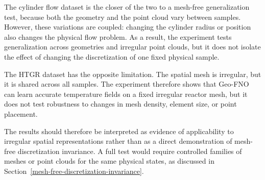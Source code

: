 The cylinder flow dataset is the closer of the two to a mesh-free generalization test, because both the geometry and the point cloud vary between samples. However, these variations are coupled: changing the cylinder radius or position also changes the physical flow problem. As a result, the experiment tests generalization across geometries and irregular point clouds, but it does not isolate the effect of changing the discretization of one fixed physical sample.

The HTGR dataset has the opposite limitation. The spatial mesh is irregular, but it is shared across all samples. The experiment therefore shows that Geo-FNO can learn accurate temperature fields on a fixed irregular reactor mesh, but it does not test robustness to changes in mesh density, element size, or point placement.

The results should therefore be interpreted as evidence of applicability to irregular spatial representations rather than as a direct demonstration of mesh-free discretization invariance. A full test would require controlled families of meshes or point clouds for the same physical states, as discussed in Section~\ref{mesh-free-discretization-invariance}.